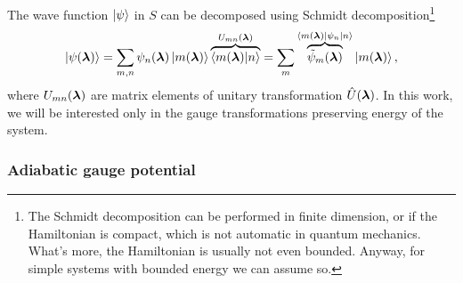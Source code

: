 The wave function $\ket{\psi}$ in $S$ can be decomposed using Schmidt decomposition\footnote{The Schmidt decomposition can be performed in finite dimension, or if the Hamiltonian is compact, which is not automatic in quantum mechanics. What's more, the Hamiltonian is usually not even bounded. Anyway, for simple systems with bounded energy we can assume so.}
\begin{equation}
    \ket{\psi({\bm\lambda})} = \sum_{m,n}\psi_n({\bm\lambda}) \ket{m({\bm\lambda})}\overbrace{\braket{m({\bm\lambda})|n}}^{U_{mn}({\bm\lambda})} =\sum_m \overbrace{\tilde{\psi}_m({\bm\lambda})}^{\braket{m({\bm\lambda})|\psi_n|n}}\ket{m({\bm\lambda})},
\end{equation}
where $U_{mn}({\bm\lambda})$ are matrix elements of unitary transformation $\hat{U}({\bm\lambda})$. In this work, we will be interested only in the gauge transformations preserving energy of the system.





\subsubsection{Adiabatic gauge potential}


